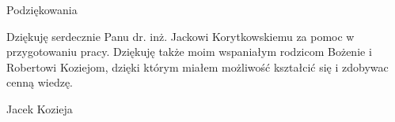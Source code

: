 \noindent
{\Large Podziękowania}
\bigskip

Dziękuję serdecznie Panu dr. inż. Jackowi Korytkowskiemu za pomoc w przygotowaniu pracy.
Dziękuję także moim wspaniałym rodzicom Bożenie i Robertowi Koziejom, dzięki którym miałem możliwość kształcić się i zdobywac cenną wiedzę.

\bigskip

{\raggedleft
Jacek Kozieja

}

